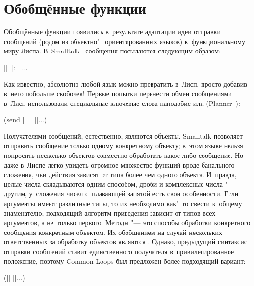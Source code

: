 \section{Обобщённые функции}\label{objects/sect:generics}

Обобщённые функции появились в~результате адаптации идеи отправки сообщений
(родом из объектно"=ориентированных языков) к~функциональному миру Лиспа.
В~Smalltalk~\cite{gr83} сообщения посылаются следующим образом:

\begin{code}[escapeinside=||]
|| ||: ||...
\end{code}

\indexC{=>}
Как известно, абсолютно любой язык можно превратить в~Лисп, просто добавив
в~него побольше скобочек! Первые попытки перенести обмен сообщениями в~Лисп
использовали специальные ключевые слова наподобие  или \ic{=>}
(Planner~\cite{hs75}):

\begin{code:lisp}
(send || || ||...)
\end{code:lisp}

Получателями сообщений, естественно, являются объекты. Smalltalk позволяет
отправить сообщение только одному конкретному объекту; в~этом языке нельзя
попросить несколько объектов совместно обработать какое-либо сообщение. Но
даже в~Лиспе легко увидеть огромное множество функций вроде банального
сложения, чьи действия зависят от типа более чем одного объекта. И~правда,
целые числа складываются одним способом, дроби и комплексные числа "---
другим, у~сложения чисел с~плавающей запятой есть свои особенности. Если
аргументы имеют различные типы, то их необходимо как"~то свести к~общему
знаменателю; подходящий алгоритм приведения зависит от типов всех аргументов,
а не~только первого. Методы "--- это способы обработки конкретного сообщения
конкретным объектом. Их обобщением на случай нескольких ответственных за
обработку объектов являются . Однако, предыдущий синтаксис
отправки сообщений ставит единственного получателя в~привилегированное
положение, поэтому Common Loops \cite{bkk+86} был предложен более подходящий
вариант:

\begin{code:lisp}
(|| ||...)
\end{code:lisp}

